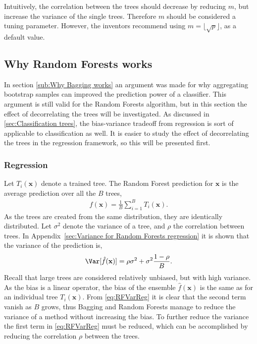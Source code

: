 Intuitively, the correlation between the trees should decrease by reducing $m$, but increase the variance of the single trees. Therefore $m$ should be considered a tuning parameter. However, the inventors recommend using $m = \lfloor \sqrt{p} \rfloor$, as a default value.

\subsection{Why Random Forests works}
\label{sub:Why Random Forests works}
In section \ref{sub:Why Bagging works} an argument was made for why aggregating bootstrap samples can improved the prediction power of a classifier. This argument is still valid for the Random Forests algorithm, but in this section the effect of decorrelating the trees will be investigated. As discussed in \ref{sec:Classification trees}, the bias-variance tradeoff from regression is sort of applicable to classification as well. It is easier to study the effect of decorrelating  the trees in the regression framework, so this will be presented first.

\subsubsection{Regression}
\label{sub:Regression}

Let $T_i(\mathbf{x})$ denote a trained tree. The Random Forest prediction for $\mathbf{x}$ is the average prediction over all the $B$ trees,
\begin{align}
  \hat f(\mathbf{x}) = \frac{1}{B} \sum_{i = 1}^{B} T_i(\mathbf{x}).
\end{align}
As the trees are created from the same distribution, they are identically distributed. Let $\sigma^2$ denote the variance of a tree, and $\rho$ the correlation between trees. In Appendix~\ref{sec:Variance for Random Forests regression} it is shown that the variance of the prediction is, 
\begin{align}
\label{eq:RFVarReg} 
  \Var[\hat f(\mathbf{x})] = \rho \sigma^2 + \sigma^2 \frac{1-\rho}{B}.
\end{align}
Recall that large trees are considered relatively unbiased, but with high variance. As the bias is a linear operator, the bias of the ensemble $\hat f(\mathbf{x})$ is the same as for an individual tree $T_i(\mathbf{x})$. From \eqref{eq:RFVarReg} it is clear that the second term vanish as $B$ grows, thus Bagging and Random Forests manage to reduce the variance of a method without increasing the bias. To further reduce the variance the first term in \eqref{eq:RFVarReg} must be reduced, which can be accomplished by reducing the correlation $\rho$ between the trees. 

